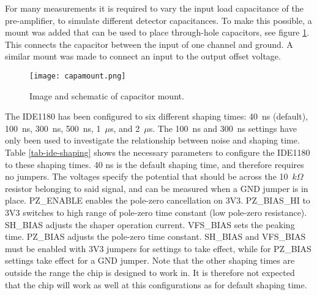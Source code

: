 \documentclass[../main/thesis.tex]{subfiles}
\begin{document}
For many measurements it is required to vary the input load capacitance of the pre-amplifier, to simulate different detector capacitances. To make this possible, a mount was added that can be used to place through-hole capacitors, see figure \ref{fig-capmount}. This connects the capacitor between the input of one channel and ground. A similar mount was made to connect an input to the output offset voltage.

\begin{figure}%
	\centering
	\texttt{[image: capamount.png]}
	\caption{Image and schematic of capacitor mount. \citep{Thomas} \citep{IDE1180sch}}
	\label{fig-capmount}
\end{figure} 

The IDE1180 has been configured to six different shaping times: 40~ns (default), 100~ns, 300~ns, 500~ns, 1~$\mu$s, and 2~$\mu$s. The 100~ns and 300~ns settings have only been used to investigate the relationship between noise and shaping time. Table \ref{tab-ide-shaping} shows the necessary parameters to configure the IDE1180 to these shaping times. 40 ns is the default shaping time, and therefore requires no jumpers. The voltages specify the potential that should be across the 10~$k\Omega$ resistor belonging to said signal, and can be measured when a GND jumper is in place. PZ\_ENABLE enables the pole-zero cancellation on 3V3. PZ\_BIAS\_HI to 3V3 switches to high range of pole-zero time constant (low pole-zero resistance). SH\_BIAS adjusts the shaper operation current. VFS\_BIAS sets the peaking time. PZ\_BIAS adjusts the pole-zero time constant. SH\_BIAS and VFS\_BIAS must be enabled with 3V3 jumpers for settings to take effect, while for PZ\_BIAS settings take effect for a GND jumper. Note that the other shaping times are outside the range the chip is designed to work in. It is therefore not expected that the chip will work as well at this configurations as for default shaping time.
\end{document}
